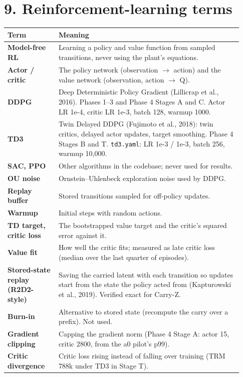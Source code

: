 \documentclass[11pt]{article}
\begin{document}
\section*{9. Reinforcement-learning terms}



\begin{center}\small\begin{tabular}{>{\raggedright\arraybackslash}p{0.206\linewidth}>{\raggedright\arraybackslash}p{0.728\linewidth}}
\toprule
Term & Meaning \\
\midrule
\textbf{Model-free RL} & Learning a policy and value function from sampled transitions, never using the plant's equations. \\
\textbf{Actor / critic} & The policy network (observation $\rightarrow$ action) and the value network (observation, action $\rightarrow$ Q). \\
\textbf{DDPG} & Deep Deterministic Policy Gradient (Lillicrap et al., 2016). Phases 1--3 and Phase 4 Stages A and C. Actor LR 1e-4, critic LR 1e-3, batch 128, warmup 1000. \\
\textbf{TD3} & Twin Delayed DDPG (Fujimoto et al., 2018): twin critics, delayed actor updates, target smoothing. Phase 4 Stages B and T. \texttt{td3.yaml}: LR 1e-3 / 1e-3, batch 256, warmup 10,000. \\
\textbf{SAC, PPO} & Other algorithms in the codebase; never used for results. \\
\textbf{OU noise} & Ornstein--Uhlenbeck exploration noise used by DDPG. \\
\textbf{Replay buffer} & Stored transitions sampled for off-policy updates. \\
\textbf{Warmup} & Initial steps with random actions. \\
\textbf{TD target, critic loss} & The bootstrapped value target and the critic's squared error against it. \\
\textbf{Value fit} & How well the critic fits; measured as late critic loss (median over the last quarter of episodes). \\
\textbf{Stored-state replay (R2D2-style)} & Saving the carried latent with each transition so updates start from the state the policy acted from (Kapturowski et al., 2019). Verified exact for Carry-Z. \\
\textbf{Burn-in} & Alternative to stored state (recompute the carry over a prefix). Not used. \\
\textbf{Gradient clipping} & Capping the gradient norm (Phase 4 Stage A: actor 15, critic 2800, from the a0 pilot's p99). \\
\textbf{Critic divergence} & Critic loss rising instead of falling over training (TRM 788k under TD3 in Stage T). \\
\bottomrule
\end{tabular}\end{center}
\end{document}
